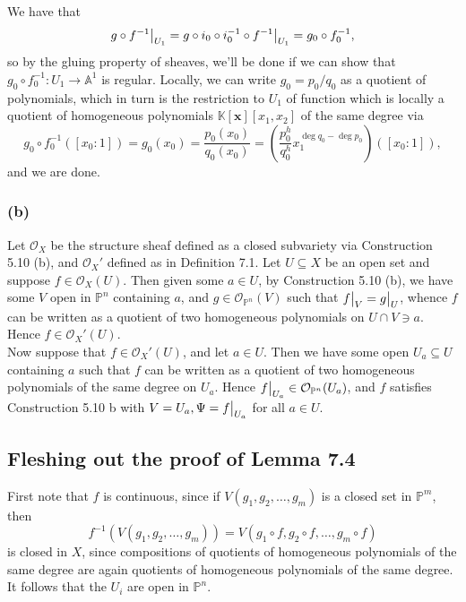 \documentclass{article}
\newcommand\restr[2]{{%
  \left.\kern-\nulldelimiterspace %
  #1 %
  \vphantom{\big|} %
  \right|_{#2} %
  }}
\theoremstyle{definition}
\newcommand{\K}{\mathbb{K}}
\renewcommand{\P}{\mathbb{P}}
\newcommand{\A}{\mathbb{A}}
\newcommand{\Kx}{\K[\bm{x}]}
\renewcommand{\AA}[1]{\A^{#1}}
\newcommand{\Pn}{\P^n}
\newcommand{\Pm}{\P^m}
\begin{document}
We have that
\[
	\restr{g \circ f^{-1}}{U_1} 
	=
	g \circ i_0 \circ i_0^{-1} \circ \restr{f^{-1}}{U_1} 
	= 
	g_0 \circ f_0^{-1},
\]
so by the gluing property of sheaves, we'll be done if we can show that $g_0
\circ f_0^{-1} : U_1 \to \AA{1}$ is regular. Locally, we can write $g_0 =
p_0/q_0$ as a quotient of polynomials, which in turn is the restriction to
$U_1$ of function which is locally a quotient of homogeneous polynomials
$\Kx[x_1,x_2]$ of the same degree via
\[
	g_0 \circ f_0^{-1}([x_0 : 1]) 
	= 
	g_0(x_0) 
	= 
	\frac{p_0(x_0)}{q_0(x_0)}
	= 
	\left(\frac{p_0^{h}}{q_0^{h}}x_1^{\deg q_0 - \deg p_0}\right)([x_0 : 1]),
\]
and we are done.

\subsubsection*{(b)}

Let $\mathcal{O}_{X}$ be the structure sheaf defined as a closed subvariety via
Construction 5.10 (b), and $\mathcal{O}_X'$ defined as in Definition 7.1. Let
$U \subseteq X$ be an open set and suppose $f \in \mathcal{O}_X(U)$. Then given
some $a \in U$, by Construction 5.10 (b), we have some $V$ open in $\Pn$
containing $a$, and $g \in \mathcal{O}_{\Pn}(V)$ such that $\restr{f}{V} =
\restr{g}{U}$, whence $f$ can be written as a quotient of two homogeneous
polynomials on $U \cap V \ni a$. Hence $f \in \mathcal{O}_X'(U)$. \\

Now suppose that $f \in \mathcal{O}_X'(U)$, and let $a \in U$. Then we have
some open $U_a \subseteq U$ containing $a$ such that $f$ can be written as a
quotient of two homogeneous polynomials of the same degree on $U_a$. Hence
$\restr{f}{U_a} \in \mathcal{O}_{\Pn}(U_a)$, and $f$ satisfies Construction
5.10 b with $V = U_a, \Psi = \restr{f}{U_a}$ for all $a \in U$.

\subsection*{Fleshing out the proof of Lemma 7.4}

First note that $f$ is continuous, since if $V(g_1, g_2, \ldots, g_m)$ is a
closed set in $\Pm$, then
\[
	f^{-1}(V(g_1, g_2, \ldots, g_m))
	=
	V(g_1 \circ f, g_2 \circ f, \ldots, g_m \circ f)
\] 
is closed in $X$, since compositions of quotients of homogeneous polynomials of
the same degree are again quotients of homogeneous polynomials of the same
degree. It follows that the $U_i$ are open in $\Pn$. \\
\end{document}
